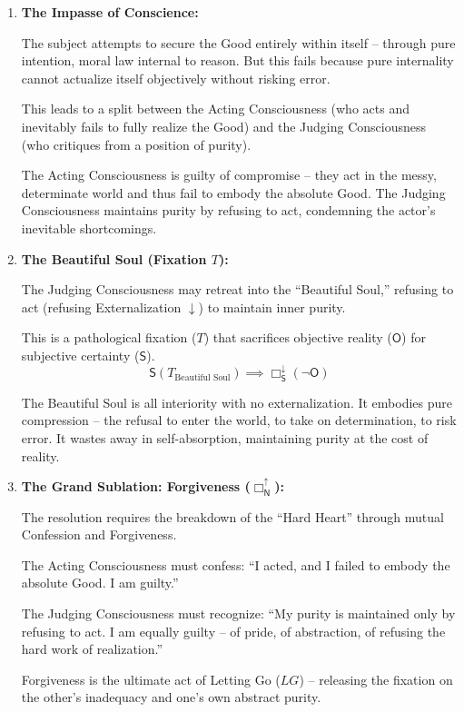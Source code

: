 \documentclass[12pt]{book}
\newcommand{\SBoxDown}{\Box_{\mathsf{S}}^{\downarrow}}
\newcommand{\NBoxUp}{\Box_{\mathsf{N}}^{\uparrow}}
\begin{document}
\begin{enumerate}
\item \textbf{The Impasse of Conscience:}

The subject attempts to secure the Good entirely within itself -- through pure intention, moral law internal to reason. But this fails because pure internality cannot actualize itself objectively without risking error.

This leads to a split between the Acting Consciousness (who acts and inevitably fails to fully realize the Good) and the Judging Consciousness (who critiques from a position of purity).

The Acting Consciousness is guilty of compromise -- they act in the messy, determinate world and thus fail to embody the absolute Good. The Judging Consciousness maintains purity by refusing to act, condemning the actor's inevitable shortcomings.

\item \textbf{The Beautiful Soul (Fixation $T$):}

The Judging Consciousness may retreat into the ``Beautiful Soul,'' refusing to act (refusing Externalization $\downarrow$) to maintain inner purity.

This is a pathological fixation ($T$) that sacrifices objective reality ($\mathsf{O}$) for subjective certainty ($\mathsf{S}$).
\[
\mathsf{S}(T_{\text{Beautiful Soul}}) \implies \SBoxDown(\neg \mathsf{O})
\]

The Beautiful Soul is all interiority with no externalization. It embodies pure compression -- the refusal to enter the world, to take on determination, to risk error. It wastes away in self-absorption, maintaining purity at the cost of reality.

\item \textbf{The Grand Sublation: Forgiveness ($\NBoxUp$):}

The resolution requires the breakdown of the ``Hard Heart'' through mutual Confession and Forgiveness.

The Acting Consciousness must confess: ``I acted, and I failed to embody the absolute Good. I am guilty.''

The Judging Consciousness must recognize: ``My purity is maintained only by refusing to act. I am equally guilty -- of pride, of abstraction, of refusing the hard work of realization.''

Forgiveness is the ultimate act of Letting Go ($LG$) -- releasing the fixation on the other's inadequacy and one's own abstract purity.


\end{enumerate}
\end{document}
